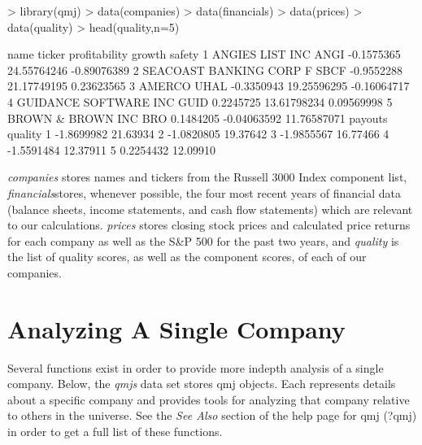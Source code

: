 \documentclass[titlepage]{article}
\begin{document}
\begin{Schunk}
\begin{Sinput}
> library(qmj)
> data(companies) 
> data(financials) 
> data(prices) 
> data(quality)
> head(quality,n=5)
\end{Sinput}
\begin{Soutput}
                     name ticker profitability      growth      safety
1         ANGIES LIST INC   ANGI    -0.1575365 24.55764246 -0.89076389
2 SEACOAST BANKING CORP F   SBCF    -0.9552288 21.17749195  0.23623565
3                  AMERCO   UHAL    -0.3350943 19.25596295 -0.16064717
4   GUIDANCE SOFTWARE INC   GUID     0.2245725 13.61798234  0.09569998
5       BROWN & BROWN INC    BRO     0.1484205 -0.04063592 11.76587071
     payouts  quality
1 -1.8699982 21.63934
2 -1.0820805 19.37642
3 -1.9855567 16.77466
4 -1.5591484 12.37911
5  0.2254432 12.09910
\end{Soutput}
\end{Schunk}

\textit{companies} stores names and tickers from the Russell 3000 Index component list, \textit{financials}stores, whenever possible, the four most recent years of financial data (balance sheets, income statements, and cash flow statements) which are relevant to our calculations. \textit{prices} stores closing stock prices and calculated price returns for each company as well as the S\&P 500 for the past two years, and \textit{quality} is the list of quality scores, as well as the component scores, of each of our companies.


\section*{Analyzing A Single Company}
Several functions exist in order to provide more indepth analysis of a single company. Below, the \textit{qmjs} data set stores qmj objects. Each represents details about a specific company and provides tools for analyzing that company relative to others in the universe. See the \textit{See Also} section of the help page for qmj (?qmj) in order to get a full list of these functions.
\end{document}
